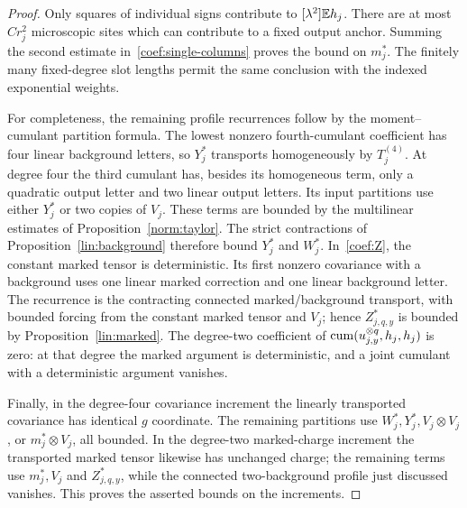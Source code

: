 \begin{proof}
Only squares of individual signs contribute to $[\lambda^2]\mathbb E h_j$.
There are at most $C r_j^2$ microscopic sites which can contribute to a fixed
output anchor.  Summing the second estimate in~\eqref{coef:single-columns}
proves the bound on $m_j^*$.  The finitely many fixed-degree slot lengths
permit the same conclusion with the indexed exponential weights.

For completeness, the remaining profile recurrences follow by the
moment--cumulant partition formula.  The lowest nonzero fourth-cumulant
coefficient has four linear background letters, so $Y_j^*$ transports
homogeneously by $T_j^{(4)}$.  At degree four the third cumulant has, besides
its homogeneous term, only a quadratic output letter and two linear output
letters.  Its input partitions use either $Y_j^*$ or two copies of $V_j$.
These terms are bounded by the multilinear estimates of
Proposition~\ref{norm:taylor}.  The strict contractions of
Proposition~\ref{lin:background} therefore bound $Y_j^*$ and $W_j^*$.
In~\eqref{coef:Z}, the constant marked tensor is deterministic.  Its first
nonzero covariance with a background uses one linear marked correction and
one linear background letter.  The recurrence is the contracting connected
marked/background transport, with bounded forcing from the constant marked
tensor and $V_j$; hence $Z_{j,q,y}^*$ is bounded by
Proposition~\ref{lin:marked}.  The degree-two coefficient of
$\operatorname{cum}(u_{j,y}^{\otimes q},h_j,h_j)$ is zero: at that degree the marked
argument is deterministic, and a joint cumulant with a deterministic
argument vanishes.

Finally, in the degree-four covariance increment the linearly transported
covariance has identical $g$ coordinate.  The remaining partitions use
$W_j^*,Y_j^*,V_j\otimes V_j$, or $m_j^*\otimes V_j$, all bounded.  In the
degree-two marked-charge increment the transported marked tensor likewise
has unchanged charge; the remaining terms use $m_j^*,V_j$ and
$Z_{j,q,y}^*$, while the connected two-background profile just discussed
vanishes.  This proves the asserted bounds on the increments.
\end{proof}

